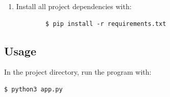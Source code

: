 \documentclass[12pt]{article}
\begin{document}
{\begin{enumerate}
		\item Install all project dependencies with:
		\begin{verbatim}
		$ pip install -r requirements.txt
		\end{verbatim}
	\end{enumerate}




\subsection{Usage}
In the project directory, run the program with:

\begin{verbatim}
$ python3 app.py
\end{verbatim}

\newpage
\printbibliography[heading=bibintoc, title={Sources}]





}
\end{document}
